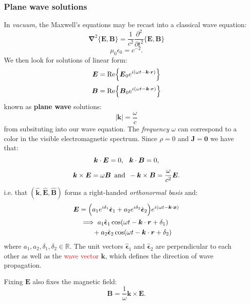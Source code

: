 \documentclass{article}
\newcommand{\vc}[1]{\boldsymbol{#1}}
\begin{document}
\begin{multicols*}{3}
\newcolumn

\subsubsection*{Plane wave solutions}
In \textit{vacuum}, the Maxwell's equations may be recast into
a classical wave equation:
$$\vc{\nabla}^2\{\vc{E},\vc{B}\}=\frac{1}{c^2}
\frac{\partial^2}{\partial t^2}\{\vc{E},\vc{B}\}$$
$$\mu_0\epsilon_0=c^{-2}.$$
We then look for solutions of linear form:
$$\vc{E}=\Re\Bigl\{\vc{E}_0 e^{i(\omega t-\vc{k}\cdot\vc{r})}\Bigr\}$$
$$\vc{B}=\Re\Bigl\{\vc{B}_0 e^{i(\omega t-\vc{k}\cdot\vc{r})}\Bigr\}$$
known as \textbf{plane wave} solutions:
$$|\vc{k}|=\frac{\omega}{c}$$
from subsituting into our wave equation. The \textit{frequency}
$\omega$ can correspond to a color in the visible
electromagnetic spectrum.
Since $\rho=0$ and $\vc{J}=\vc{0}$ we have that:
$$\vc{k}\cdot\vc{E}=0,\hspace{0.1in}\vc{k}\cdot\vc{B}=0,$$
$$\vc{k}\times\vc{E}=\omega\vc{B}\hspace{0.07in}\text{and}
\hspace{0.07in}-\vc{k}\times\vc{B}=\frac{\omega}{c^2}\vc{E}.$$
i.e. that $(\hat{\vc{k}},\hat{\vc{E}},\hat{\vc{B}})$ forms a
right-handed \textit{orthonormal basis} and:
\begin{align*}
    \vc{E}
    &=\Bigl(a_1 e^{i\delta_1}\hat{\vc{\epsilon}}_1
    +a_2 e^{i\delta_2}\hat{\vc{\epsilon}}_2\Bigr)
    e^{i(\omega t-\vc{k}\cdot\vc{x})} \\
    &\implies 
    a_1\hat{\vc{\epsilon}}_1\cos(\omega t-\vc{k}\cdot\vc{r}+\delta_1) \\
    &\qquad+a_2\hat{\vc{\epsilon}}_2\cos(\omega t-\vc{k}\cdot\vc{r}+\delta_2)
\end{align*}
where $a_1,a_2,\delta_1,\delta_2\in\mathbb{R}$. The unit vectors
$\hat{\vc{\epsilon}}_1$ and $\hat{\vc{\epsilon}}_2$ are
perpendicular to each other as well as the \textcolor{red}{wave vector} 
$\vc{k}$, which defines the direction of wave propagation.

Fixing $\vc{E}$ also fixes the magnetic field:
$$\vc{B}=\frac{1}{\omega}\vc{k}\times\vc{E}.$$


\end{multicols*}
\end{document}
